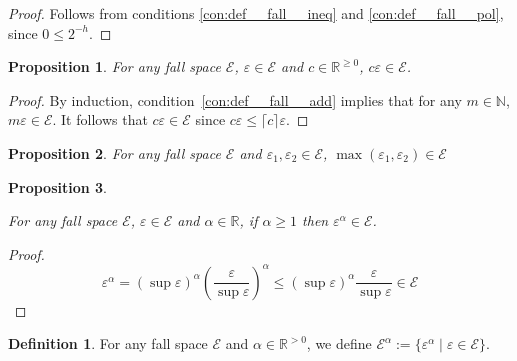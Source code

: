 \documentclass{article}
\numberwithin{equation}{section}
\theoremstyle{definition}
\newtheorem{definition}{Definition}[section]
\theoremstyle{plain}
\newtheorem{proposition}{Proposition}[section]
\newcommand{\Nats}{\mathbb{N}}
\newcommand{\Reals}{\mathbb{R}}
\newcommand{\Ceil}[1]{\lceil #1 \rceil}
\newcommand{\Fall}{\mathcal{E}}
\begin{document}
\begin{proof}

Follows from conditions \ref{con:def__fall__ineq} and \ref{con:def__fall__pol}, since $0 \leq 2^{-h}$.
\end{proof}

\begin{proposition}

For any fall space $\Fall$, $\varepsilon \in \Fall$ and $c \in \Reals^{\geq 0}$, $c \varepsilon \in \Fall$.

\end{proposition}

\begin{proof}

By induction, condition~\ref{con:def__fall__add} implies that for any $m \in \Nats$, $m\varepsilon \in \Fall$. It follows that $c\varepsilon \in \Fall$ since $c\varepsilon \leq \Ceil{c}\varepsilon$.
\end{proof}

\begin{proposition}

For any fall space $\Fall$ and $\varepsilon_1, \varepsilon_2 \in \Fall$, $\max(\varepsilon_1,\varepsilon_2) \in \Fall$

\end{proposition}


\begin{proposition}
\label{prp:fall_space_closed_wrt_power}

For any fall space $\Fall$, $\varepsilon \in \Fall$ and $\alpha \in \Reals$, if $\alpha \geq 1$ then $\varepsilon^\alpha \in \Fall$.

\end{proposition}

\begin{proof}

$$\varepsilon^\alpha = (\sup \varepsilon)^\alpha (\frac{\varepsilon}{\sup \varepsilon})^\alpha \leq  (\sup \varepsilon)^\alpha \frac{\varepsilon}{\sup \varepsilon} \in \Fall$$
\end{proof}

\begin{samepage}
\begin{definition}

For any fall space $\Fall$ and $\alpha \in \Reals^{>0}$, we define ${\Fall^\alpha := \{\varepsilon^\alpha \mid \varepsilon \in \Fall\}}$.

\end{definition}
\end{samepage}
\end{document}
